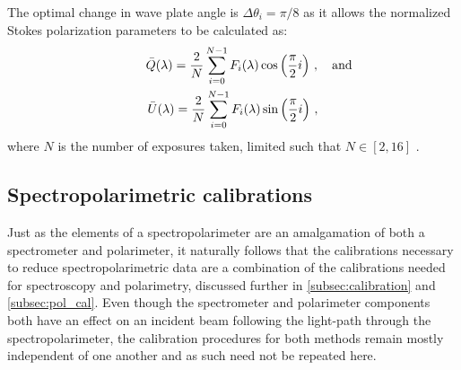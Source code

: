 The optimal change in wave plate angle is $\Delta\theta_{i} = \pi/8$ as it allows the normalized Stokes polarization parameters to be calculated as:
\begin{equation}
    \begin{gathered}
        \bar{Q}(\lambda) = \frac{2}{N} \sum_{i = 0}^{N - 1} F_{i}(\lambda) \cos\left(\frac{\pi}{2} i\right)\,,\rlap{\quad and}\\
        \bar{U}(\lambda) = \frac{2}{N} \sum_{i = 0}^{N - 1} F_{i}(\lambda) \sin\left(\frac{\pi}{2} i\right)\,,
    \end{gathered}\label{eq:specpol_Stokes_sol}
\end{equation}
where $N$ is the number of exposures taken, limited such that $N \in [2, 16]$ \citep{polarimetry_error}.




\subsection{Spectropolarimetric calibrations}\label{subsec:specpol_cal}

Just as the elements of a spectropolarimeter are an amalgamation of both a spectrometer and polarimeter, it naturally follows that the calibrations necessary to reduce spectropolarimetric data are a combination of the calibrations needed for spectroscopy and polarimetry, discussed further in \autoref{subsec:calibration} and \autoref{subsec:pol_cal}. Even though the spectrometer and polarimeter components both have an effect on an incident beam following the light-path through the spectropolarimeter, the calibration procedures for both methods remain mostly independent of one another and as such need not be repeated here.

